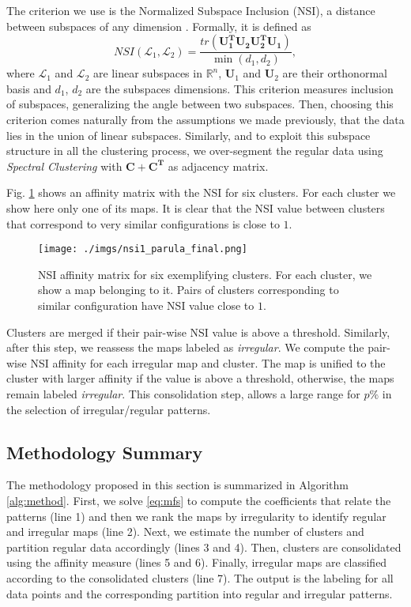 The criterion we use is the Normalized Subspace Inclusion (NSI), a distance between subspaces of any dimension \cite{silva2009normalized}.
Formally, it is defined as
\begin{equation}
    NSI(\mathcal{L}_1,\mathcal{L}_2) = \frac{tr(\mathbf{U_1^T U_2 U_2^T U_1})}{\min (d_1,d_2)},
\end{equation}
where $\mathcal{L}_1$ and $\mathcal{L}_2$ are linear subspaces in $\mathbb{R}^n$, $\mathbf{U}_1$ and $\mathbf{U}_2$ are their orthonormal basis and $d_1$, $d_2$ are the subspaces dimensions.
This criterion measures inclusion of subspaces, generalizing the angle between two subspaces.
Then, choosing this criterion comes naturally from the assumptions we made previously, that the data lies in the union of linear subspaces. 
    Similarly, and to exploit this subspace structure in all the clustering process, we over-segment the regular data using \emph{Spectral Clustering} with $\mathbf{C+C^T}$ as adjacency matrix.

%
Fig. \ref{fig:nsi-matrix} shows an affinity matrix with the NSI for six clusters. For each cluster we show here only one of its maps.  
It is clear that the NSI value between clusters that correspond to very similar configurations is close to $1$. 
%
\begin{figure}[thb]
\centering
\texttt{[image: ./imgs/nsi1\_parula\_final.png]}
\caption{NSI affinity matrix for six exemplifying clusters. For each cluster, we show a map belonging to it. Pairs of clusters corresponding to similar configuration have NSI value close to $1$.}
\label{fig:nsi-matrix}
\end{figure}

Clusters are merged if their pair-wise NSI value is above a threshold.
Similarly, after this step, we reassess the maps labeled as \emph{irregular}. We compute the pair-wise NSI affinity for each irregular map and cluster. The map is unified to the cluster with larger affinity if the value is above a threshold, otherwise, the maps remain labeled \emph{irregular}.
This consolidation step, allows a large range for $p\%$ in the selection of irregular/regular patterns. 
%
\subsection{Methodology Summary}

The methodology proposed in this section is summarized in Algorithm \ref{alg:method}.
First, we solve \eqref{eq:mfs} to compute the coefficients that relate the patterns (line 1) and then we rank the maps by irregularity to identify regular and irregular maps (line 2). Next, we estimate the number of clusters and partition regular data accordingly (lines 3 and 4). Then, clusters are consolidated using the affinity measure (lines 5 and 6). Finally, irregular maps are classified according to the consolidated clusters (line 7). The output is the labeling for all data points and the corresponding partition into regular and irregular patterns.


